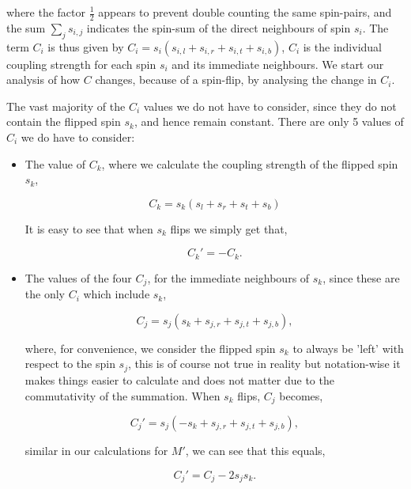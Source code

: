 \documentclass{IAYCPro}
\begin{document}
where the factor $\frac{1}{2}$ appears to prevent double counting the same spin-pairs, and the sum $\sum_j s_{i,j}$ indicates the spin-sum of the direct neighbours of spin $s_i$. The term $C_i$ is thus given by $C_i = s_i (s_{i,l} + s_{i,r} + s_{i,t} + s_{i,b})$, $C_i$ is the individual coupling strength for each spin $s_i$ and its immediate neighbours. We start our analysis of how $C$ changes, because of a spin-flip, by analysing the change in $C_i$. 

\raggedbottom
\newpage

The vast majority of the $C_i$ values we do not have to consider, since they do not contain the flipped spin $s_k$, and hence remain constant. There are only 5 values of $C_i$ we do have to consider:

\begin{itemize}
\item  The value of $C_k$, where we calculate the coupling strength of the flipped spin $s_k$,

\begin{equation}
    C_k = s_k (s_{l} + s_{r} + s_{t} + s_{b})
\end{equation}

It is easy to see that when $s_k$ flips we simply get that,

\begin{equation}
    C_k' = -C_k.
\end{equation}

\item The values of the four $C_j$, for the immediate neighbours of $s_k$, since these are the only $C_i$ which include $s_k$,

\begin{equation}
    C_j = s_j(s_{k} + s_{j,r} + s_{j,t} + s_{j,b}),
\end{equation}

where, for convenience, we consider the flipped spin $s_k$ to always be 'left' with respect to the spin $s_j$, this is of course not true in reality but notation-wise it makes things easier to calculate and does not matter due to the commutativity of the summation.
When $s_k$ flips, $C_j$ becomes,

\begin{equation}
    C_j' = s_j(-s_{k} + s_{j,r} + s_{j,t} + s_{j,b}),
\end{equation}

similar in our calculations for $M'$, we can see that this equals,

\begin{equation}
    C_j' = C_j - 2s_js_k.
\end{equation}

\end{itemize}
\end{document}
